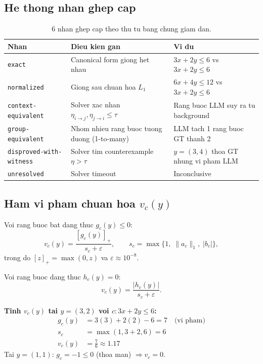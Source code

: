 \documentclass[11pt,a4paper]{article}
\begin{document}
\subsection{He thong nhan ghep cap}

\begin{table}[htbp]
\centering
\caption{6 nhan ghep cap theo thu tu bang chung giam dan.}
\small
\begin{tabularx}{\textwidth}{L{3.8cm} Y Y}
\toprule
\textbf{Nhan} & \textbf{Dieu kien gan} & \textbf{Vi du} \\
\midrule
\texttt{exact}
  & Canonical form giong het nhau
  & $3x+2y\leq6$ vs $3x+2y\leq6$ \\
\texttt{normalized}
  & Giong sau chuan hoa $L_1$
  & $6x+4y\leq12$ vs $3x+2y\leq6$ \\
\texttt{context-equivalent}
  & Solver xac nhan $\eta_{i\to j},\eta_{j\to i}\leq\tau$
  & Rang buoc LLM suy ra tu background \\
\texttt{group-equivalent}
  & Nhom nhieu rang buoc tuong duong (1-to-many)
  & LLM tach 1 rang buoc GT thanh 2 \\
\texttt{disproved-with-witness}
  & Solver tim counterexample $\eta > \tau$
  & $y=(3,4)$ thoa GT nhung vi pham LLM \\
\texttt{unresolved}
  & Solver timeout
  & Inconclusive \\
\bottomrule
\end{tabularx}
\end{table}

\subsection{Ham vi pham chuan hoa $v_c(y)$}

\begin{keyformula}
Voi rang buoc bat dang thuc $g_c(y) \leq 0$:
\[
v_c(y) = \frac{[g_c(y)]_+}{s_c + \varepsilon},
\qquad
s_c = \max\{1,\; \|a_c\|_1,\; |b_c|\},
\]
trong do $[z]_+ = \max(0, z)$ va $\varepsilon \approx 10^{-8}$.

Voi rang buoc dang thuc $h_c(y) = 0$:
\[
v_c(y) = \frac{|h_c(y)|}{s_c + \varepsilon}.
\]
\end{keyformula}

\begin{example}
\textbf{Tinh $v_c(y)$ tai $y = (3, 2)$ voi $c: 3x + 2y \leq 6$:}
\begin{align*}
g_c(y) &= 3(3) + 2(2) - 6 = 7 \quad \text{(vi pham)} \\
s_c &= \max(1, 3+2, 6) = 6 \\
v_c(y) &= \frac{7}{6} \approx 1.17
\end{align*}
Tai $y = (1, 1)$: $g_c = -1 \leq 0$ (thoa man) $\Rightarrow v_c = 0$.
\end{example}
\end{document}
